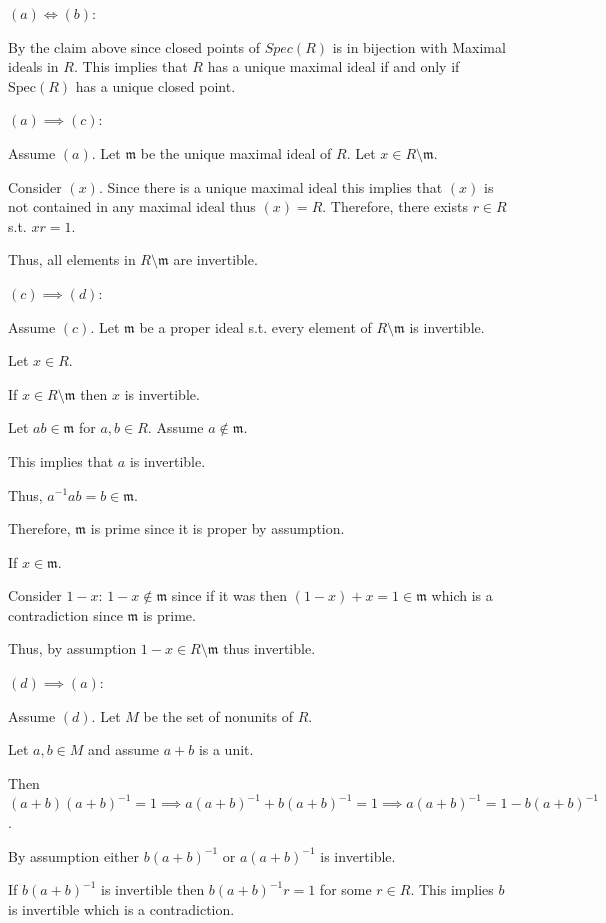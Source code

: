 \documentclass[12pt, letterpaper]{article}
\newcommand{\Spec}{\mathrm{Spec}}
\newcommand{\mf}[1]{\mathfrak{#1}}
\begin{document}
\begin{problemproof}
    $(a) \iff (b)$:

    By the claim above since closed points of $Spec(R)$ is in bijection with Maximal ideals in $R$. This implies that $R$ has a unique maximal ideal if and only if $\Spec(R)$ has a unique closed point.

    $(a) \implies (c)$:

    Assume $(a)$. Let $\mf{m}$ be the unique maximal ideal of $R$. Let $x \in R \setminus \mf{m}$.

    Consider $(x)$. Since there is a unique maximal ideal this implies that $(x)$ is not contained in any maximal ideal thus $(x)=R$. Therefore, there exists $r \in R$ s.t. $xr=1$.

    Thus, all elements in $R \setminus \mf{m}$ are invertible.

    $(c) \implies (d)$:

    Assume $(c)$. Let $\mf{m}$ be a proper ideal s.t. every element of $R \setminus \mf{m}$ is invertible. 
    
    Let $x \in R$.

    If $x \in R \setminus \mf{m}$ then $x$ is invertible.

    Let $ab \in \mf{m}$ for  $a,b \in R$. Assume $a \notin \mf{m}$.

    This implies that $a$ is invertible.

    Thus, $a^{-1}ab=b \in \mf{m}$.
    
    Therefore, $\mf{m}$ is prime since it is proper by assumption.

    If $x \in \mf{m}$.

    Consider $1-x$: $1-x \notin \mf{m}$ since if it was then $(1-x)+x=1 \in \mf{m}$ which is a contradiction since $\mf{m}$ is prime.

    Thus, by assumption $1-x \in R \setminus \mf{m}$ thus invertible.

    $(d) \implies (a)$:

    Assume $(d)$. Let $M$ be the set of nonunits of $R$.

    Let $a,b \in M$ and assume $a+b$ is a unit.

    Then $(a+b)(a+b)^{-1}=1 \implies a(a+b)^{-1}+b(a+b)^{-1}=1 \implies a(a+b)^{-1} = 1-b(a+b)^{-1}$.

    By assumption either $b(a+b)^{-1}$ or $a(a+b)^{-1}$ is invertible.

    If $b(a+b)^{-1}$ is invertible then $b(a+b)^{-1}r=1$ for some $r \in R$. This implies $b$ is invertible which is a contradiction.


\end{problemproof}
\end{document}

